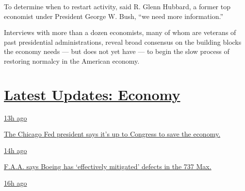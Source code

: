 To determine when to restart activity, said R. Glenn Hubbard, a former
top economist under President George W. Bush, ``we need more
information.''

Interviews with more than a dozen economists, many of whom are veterans
of past presidential administrations, reveal broad consensus on the
building blocks the economy needs --- but does not yet have --- to begin
the slow process of restoring normalcy in the American economy.

\hypertarget{latest-updates-economy}{%
\section{\texorpdfstring{\href{https://www.nytimes.com/live/2020/08/03/business/stock-market-today-coronavirus?action=click\&pgtype=Article\&state=default\&region=MAIN_CONTENT_1\&context=storylines_live_updates}{Latest
Updates:
Economy}}{Latest Updates: Economy}}\label{latest-updates-economy}}

\href{https://www.nytimes.com/live/2020/08/03/business/stock-market-today-coronavirus?action=click\&pgtype=Article\&state=default\&region=MAIN_CONTENT_1\&context=storylines_live_updates\#the-chicago-fed-president-says-its-up-to-congress-to-save-the-economy}{13h
ago}

\href{https://www.nytimes.com/live/2020/08/03/business/stock-market-today-coronavirus?action=click\&pgtype=Article\&state=default\&region=MAIN_CONTENT_1\&context=storylines_live_updates\#the-chicago-fed-president-says-its-up-to-congress-to-save-the-economy}{The
Chicago Fed president says it's up to Congress to save the economy.}

\href{https://www.nytimes.com/live/2020/08/03/business/stock-market-today-coronavirus?action=click\&pgtype=Article\&state=default\&region=MAIN_CONTENT_1\&context=storylines_live_updates\#faa-says-boeing-has-effectively-mitigated-defects-in-the-737-max}{14h
ago}

\href{https://www.nytimes.com/live/2020/08/03/business/stock-market-today-coronavirus?action=click\&pgtype=Article\&state=default\&region=MAIN_CONTENT_1\&context=storylines_live_updates\#faa-says-boeing-has-effectively-mitigated-defects-in-the-737-max}{F.A.A.
says Boeing has `effectively mitigated' defects in the 737 Max.}

\href{https://www.nytimes.com/live/2020/08/03/business/stock-market-today-coronavirus?action=click\&pgtype=Article\&state=default\&region=MAIN_CONTENT_1\&context=storylines_live_updates\#small-businesses-got-emergency-loans-but-not-what-they-expected}{16h
ago}

